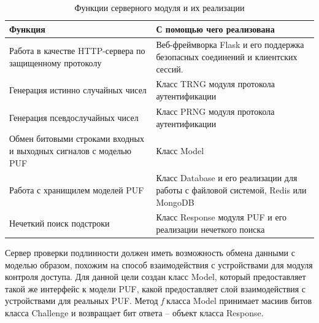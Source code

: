 \begin{table}[ht]
  \caption{Функции серверного модуля и их реализации}
  \label{table:architecture:client_funcs}
  \begin{tabular}{| >{\raggedright}m{}
                  | >{\raggedright\arraybackslash}m{}|}
   \hline
   Функция & С помощью чего реализована
   \\ \hline
   Работа в качестве HTTP-сервера по защищенному протоколу & Веб-фреймворка Flask и его поддержка безопасных соединений и клиентских сессий.
   \\ \hline
   Генерация истинно случайных чисел & Класс TRNG модуля протокола аутентификации
   \\ \hline
   Генерация псевдослучайных чисел & Класс PRNG модуля протокола аутентификации
   \\ \hline
   Обмен битовыми строками входных и выходных сигналов с моделью PUF & Класс Model
   \\ \hline
   Работа с хранищилем моделей PUF & Класс Database и его реализации для работы с файловой системой, Redis или MongoDB
   \\ \hline
   Нечеткий поиск подстроки & Класс Response модуля PUF и его реализации нечеткого поиска
   \\ \hline
  \end{tabular}
\end{table}


Сервер проверки подлинности должен иметь возможность обмена данными с моделью образом, похожим на способ взаимодействия с устройствами для модуля контроля доступа. Для данной цели создан класс Model, который предоставляет такой же интерфейс к модели PUF, какой предоставляет слой взаимодействия с устройствами для реальных PUF. Метод \emph{f} класса Model принимает масиив битов класса Challenge и возвращает бит ответа -- объект класса Response.

